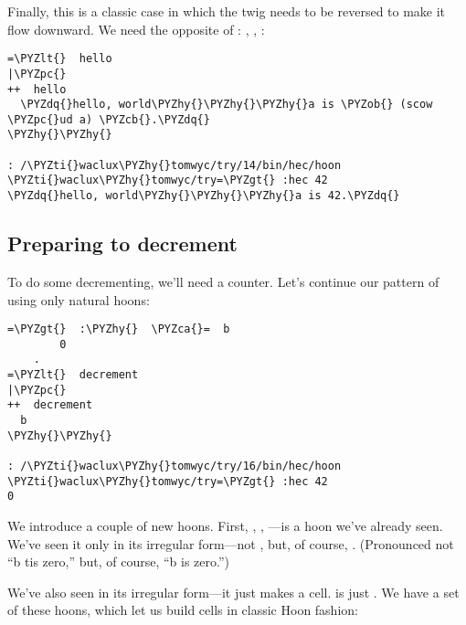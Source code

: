 Finally, this is a classic case in which the twig needs to be
reversed to make it flow downward.  We need the opposite of \kode{=\textgreater{}}:
\kode{=\textless{}}, , :
\begin{framed_shaded}
\begin{Verbatim}[fontsize=\relsize{-2.5},fontseries=b,commandchars=\\\{\}]
=\PYZlt{}  hello
|\PYZpc{}
++  hello
  \PYZdq{}hello, world\PYZhy{}\PYZhy{}\PYZhy{}a is \PYZob{} (scow \PYZpc{}ud a) \PYZcb{}.\PYZdq{}
\PYZhy{}\PYZhy{}

: /\PYZti{}waclux\PYZhy{}tomwyc/try/14/bin/hec/hoon
\PYZti{}waclux\PYZhy{}tomwyc/try=\PYZgt{} :hec 42
\PYZdq{}hello, world\PYZhy{}\PYZhy{}\PYZhy{}a is 42.\PYZdq{}
\end{Verbatim}
\end{framed_shaded}

\subsection{Preparing to decrement}

To do some decrementing, we'll need a counter.  Let's continue
our pattern of using only natural hoons:

\begin{framed_shaded}
\begin{Verbatim}[fontsize=\relsize{-2.5},fontseries=b,commandchars=\\\{\}]
=\PYZgt{}  :\PYZhy{}  \PYZca{}=  b
        0
    .
=\PYZlt{}  decrement
|\PYZpc{}
++  decrement
  b
\PYZhy{}\PYZhy{}

: /\PYZti{}waclux\PYZhy{}tomwyc/try/16/bin/hec/hoon
\PYZti{}waclux\PYZhy{}tomwyc/try=\PYZgt{} :hec 42
0
\end{Verbatim}
\end{framed_shaded}

We introduce a couple of new hoons.  First, \kode{\ket =}, ,
---is a hoon we've already seen.  We've seen it only in
its irregular form---not , but, of course, .
(Pronounced not ``b tis zero,'' but, of course, ``b is zero.'')

We've also seen \kode{:-} in its irregular form---it just makes a
cell.   is just \kode{[a b]}.  We have a set of these hoons,
which let us build cells in classic Hoon fashion:

